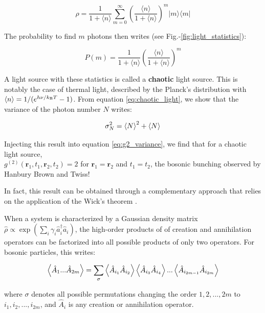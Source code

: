 \begin{equation}
    \hat{\rho}=\frac{1}{1+\langle n\rangle} \sum_{m=0}^{\infty}\left(\frac{\langle n\rangle}{1+\langle n\rangle}\right)^{m}|m\rangle\langle m|
    \label{eq:rho_chaotic}
\end{equation}

\noindent The probability to find $m$ photons then writes (see Fig.-\ref{fig:light_statistics}):

\begin{equation}
    P(m)=\frac{1}{1+\langle n\rangle}\left(\frac{\langle n\rangle}{1+\langle n\rangle}\right)^{m}
    \label{eq:chaotic_light}
\end{equation}


\noindent A light source with these statistics is called a \textbf{chaotic} light source. This is notably the case of thermal light, described by the Planck's distribution with $\left\langle n\right\rangle=1/(e^{h\nu/k_{\mathrm{B}} T}-1)$. From equation \ref{eq:chaotic_light}, we show that the variance of the photon number $N$ writes:

\begin{equation}
    \sigma_N^2=\left\langle N\right\rangle^2+\left\langle N\right\rangle
\end{equation}

\noindent Injecting this result into equation \ref{eq:g2_variance}, we find that for a chaotic light source, \\ $g^{(2)}\left(\bm{r}_{1}, t_{1}, \bm{r}_{2}, t_{2}\right)=2$ for $\bm{r}_{1}=\bm{r}_{2}$ and $t_1=t_2$, the bosonic bunching observed by Hanbury Brown and Twiss!




In fact, this result can be obtained through a complementary approach that relies on the application of the Wick's theorem \cite{gardiner2000quantum}.

\begin{tcolorbox}[colback=red!5!white,colframe=red!75!black,title=\textbf{Wick's theorem}]
\label{sec:wick}
When a system is characterized by a Gaussian density matrix $\hat{\rho} \propto \exp(\sum_i \gamma_i \hat{a}_i^{\dagger} \hat{a}_i)$, the high-order products of of creation and annihilation operators can be factorized into all possible products of only two operators. For bosonic particles, this writes:

$$ \left\langle\hat{A}_1 ... \hat{A}_{2m}\right\rangle = \sum_{\sigma} \left\langle\hat{A}_{i_1} \hat{A}_{i_2}\right\rangle \left\langle\hat{A}_{i_3} \hat{A}_{i_4}\right\rangle ... \left\langle\hat{A}_{i_{2m-1}} \hat{A}_{i_{2m}}\right\rangle$$

where $\sigma$ denotes all possible permutations changing the order $1,2,...,2m$ to $i_1,i_2,...,i_{2m}$, and $\hat{A}_i$ is any creation or annihilation operator.

\end{tcolorbox}

